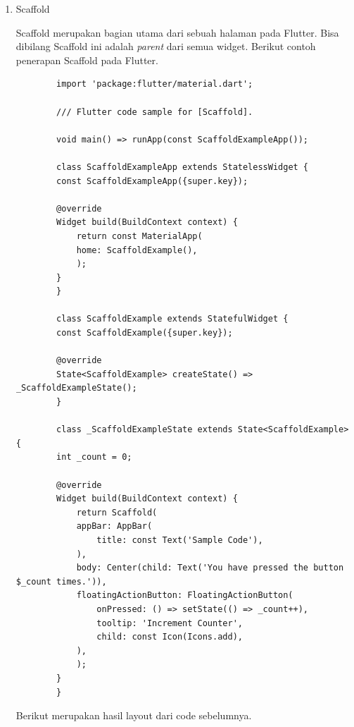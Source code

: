\begin{enumerate}
	\item Scaffold
	
	Scaffold merupakan bagian utama dari sebuah halaman pada Flutter. Bisa dibilang Scaffold ini adalah \textit{parent} dari semua widget. Berikut contoh penerapan Scaffold pada Flutter.

	\begin{lstlisting}
		import 'package:flutter/material.dart';

		/// Flutter code sample for [Scaffold].

		void main() => runApp(const ScaffoldExampleApp());

		class ScaffoldExampleApp extends StatelessWidget {
		const ScaffoldExampleApp({super.key});

		@override
		Widget build(BuildContext context) {
			return const MaterialApp(
			home: ScaffoldExample(),
			);
		}
		}

		class ScaffoldExample extends StatefulWidget {
		const ScaffoldExample({super.key});

		@override
		State<ScaffoldExample> createState() => _ScaffoldExampleState();
		}

		class _ScaffoldExampleState extends State<ScaffoldExample> {
		int _count = 0;

		@override
		Widget build(BuildContext context) {
			return Scaffold(
			appBar: AppBar(
				title: const Text('Sample Code'),
			),
			body: Center(child: Text('You have pressed the button $_count times.')),
			floatingActionButton: FloatingActionButton(
				onPressed: () => setState(() => _count++),
				tooltip: 'Increment Counter',
				child: const Icon(Icons.add),
			),
			);
		}
		}

	\end{lstlisting}

	Berikut merupakan hasil layout dari code sebelumnya.


\end{enumerate}
